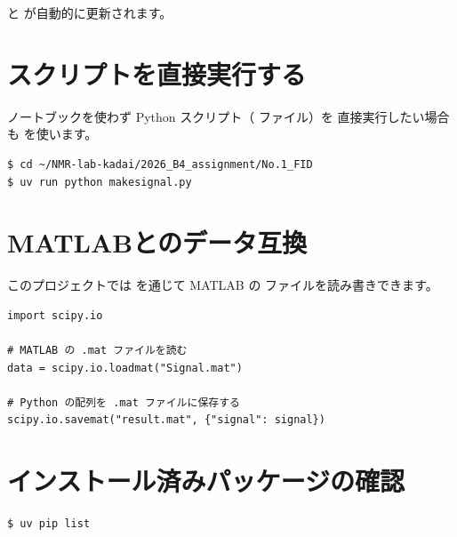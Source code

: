  と  が自動的に更新されます。

\section{スクリプトを直接実行する}

ノートブックを使わず Python スクリプト（ ファイル）を
直接実行したい場合も  を使います。

\begin{wslbox}[スクリプトの直接実行]
\begin{lstlisting}[style=bash]
$ cd ~/NMR-lab-kadai/2026_B4_assignment/No.1_FID
$ uv run python makesignal.py
\end{lstlisting}
\end{wslbox}

\section{MATLABとのデータ互換}

このプロジェクトでは  を通じて
MATLAB の  ファイルを読み書きできます。

\begin{lstlisting}[style=python, caption={.mat ファイルの読み込み例}]
import scipy.io

# MATLAB の .mat ファイルを読む
data = scipy.io.loadmat("Signal.mat")

# Python の配列を .mat ファイルに保存する
scipy.io.savemat("result.mat", {"signal": signal})
\end{lstlisting}

\section{インストール済みパッケージの確認}

\begin{wslbox}[パッケージ一覧の表示]
\begin{lstlisting}[style=bash]
$ uv pip list
\end{lstlisting}
\end{wslbox}
